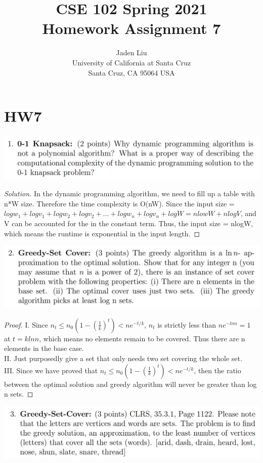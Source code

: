 \documentclass[12pt]{article}
\begin{document}
\title{ CSE 102 Spring 2021\\
	Homework Assignment 7}

\author{Jaden Liu \\ 
University of California at Santa Cruz\\
Santa Cruz, CA 95064 USA }

\maketitle


\section{HW7} 
\includegraphics[scale=0.25]{1.png}
\begin{proof}[Solution]
	In the dynamic programming algorithm, we need to fill up a table with n*W size. Therefore the time complexity is O(nW). Since the input size = $logw_1+logv_1+logw_2+logv_2 +...+logw_n+logv_n+logW = nlowW + nlogV$, and V can be accounted for the in the constant term. Thus, the input size = nlogW, which means the runtime is exponential in the input length.\cite{mark}
\end{proof}
\includegraphics[scale=0.25]{2.png}
\begin{proof}
	I. Since $n_t\le n_0(1-(\frac{1}{k})^t)<ne^{-t/k}$, $n_t$ is strictly less than $ne^{-lnn}=1$ at $t=klnn$, which means no elements remain to be covered. Thus there are n elements in the base case.\\
	II. Just purposedly give a set that only needs two set covering the whole set.\\
	III. Since we have proved that $n_t\le n_0(1-(\frac{1}{k})^t)<ne^{-t/k}$, then the ratio between the optimal solution and greedy algorithm will never be greater than log n sets.
\end{proof}
\includegraphics[scale=0.25]{3.png}
\end{document}
